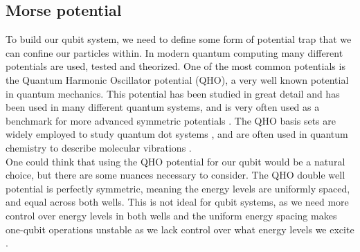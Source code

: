 \documentclass{subfiles}
\begin{document}
\subsection{Morse potential}\label{sec:morse_potential}
To build our qubit system, we need to define some form of potential trap that we can confine our particles within. In modern quantum computing many different potentials are used, tested and theorized. One of the most common potentials is the Quantum Harmonic Oscillator potential (QHO), a very well known potential in quantum mechanics. This potential has been studied in great detail and has been used in many different quantum systems, and is very often used as a benchmark for more advanced symmetric potentials \cite{griffiths2018introduction, berera2021quantum}. The QHO basis sets are widely employed to study quantum dot systems \cite{Yuan_2017}, and are often used in quantum chemistry to describe molecular vibrations \cite{atkins2011molecular}. 
\\ 

One could think that using the QHO potential for our qubit would be a natural choice, but there are some nuances necessary to consider. The QHO double well potential is perfectly symmetric, meaning the energy levels are uniformly spaced, and equal across both wells. This is not ideal for qubit systems, as we need more control over energy levels in both wells and the uniform energy spacing makes one-qubit operations unstable as we lack control over what energy levels we excite \cite{devoret2013superconducting}. 
\end{document}
